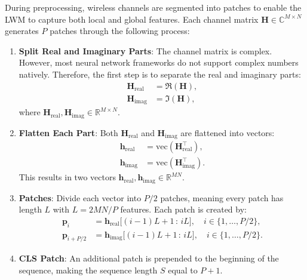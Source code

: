 During preprocessing, wireless channels are segmented into patches to enable the LWM to capture both local and global features.
Each channel matrix $\mathbf{H} \in \mathbb{C}^{M \times N}$ generates $P$ patches through the following process:

\begin{enumerate}
    \item \textbf{Split Real and Imaginary Parts}: The channel matrix is complex. However, most neural network frameworks do not support complex numbers natively. Therefore, the first step is to separate the real and imaginary parts:
    \begin{subequations}
    \begin{align}
        \mathbf{H}_{\text{real}} &= \Re(\mathbf{H}), \\
        \mathbf{H}_{\text{imag}} &= \Im(\mathbf{H}),
    \end{align}
    \end{subequations}
    where $\mathbf{H}_{\text{real}}, \mathbf{H}_{\text{imag}} \in \mathbb{R}^{M \times N}$.

    \item \textbf{Flatten Each Part}: Both $\mathbf{H}_{\text{real}}$ and $\mathbf{H}_{\text{imag}}$ are flattened into vectors:
    \begin{subequations}
        \begin{align}
            \mathbf{h}_{\text{real}} &= \text{vec} \left( \mathbf{H}_{\text{real}}^\top \right), \\
            \mathbf{h}_{\text{imag}} &= \text{vec} \left( \mathbf{H}_{\text{imag}}^\top \right).
        \end{align}
    \end{subequations}
    This results in two vectors $\mathbf{h}_{\text{real}}, \mathbf{h}_{\text{imag}} \in \mathbb{R}^{MN}$.

    \item \textbf{Patches}: Divide each vector into $P/2$ patches, meaning every patch has length $L$ with $L=2MN/P$ features. Each patch is created by:
    \begin{subequations}
        \begin{align}
            \mathbf{p}_{i} &= \mathbf{h}_{\text{real}}\big[(i - 1)L + 1 \,:\, iL\big], \quad i \in \{1, \dots, P/2\}, \\
            \mathbf{p}_{i + P/2} &= \mathbf{h}_{\text{imag}}\big[(i - 1)L + 1 \,:\, iL\big], \quad i \in \{1, \dots, P/2\}.
        \end{align}
    \end{subequations}

    \item \textbf{CLS Patch}: An additional patch is prepended to the beginning of the sequence, making the sequence length $S$ equal to $P + 1$.
\end{enumerate}

